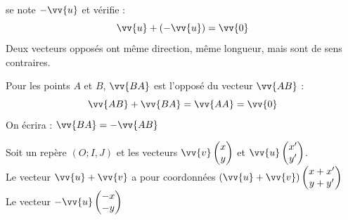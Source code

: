 \documentclass[main.tex]{subfiles}
\begin{document}
\begin{definition}
se note $-\vv{u}$ et vérifie :
\setlength{\abovedisplayskip}{3pt}
\setlength{\belowdisplayskip}{3pt} 
$$\vv{u}+(-\vv{u}) =\vv{0}$$ 
Deux vecteurs opposés ont même direction, même longueur, mais sont de sens contraires.
\end{definition}
\begin{example}Pour les points $A$ et $B$, $\vv{BA}$ est l'opposé du vecteur $\vv{AB}$ :
\setlength{\abovedisplayskip}{3pt}
\setlength{\belowdisplayskip}{3pt} 
$$\vv{AB}+\vv{BA}=\vv{AA}=\vv{0}$$  
On écrira : $\vv{BA}=-\vv{AB}$
\end{example}
\begin{tBox}
Soit un repère $(O;I,J)$ et les vecteurs $\vv{v}\begin{pmatrix}
x\\y
\end{pmatrix}$ et $\vv{u}\begin{pmatrix}
x'\\y'
\end{pmatrix}$.\\
Le vecteur $\vv{u}+\vv{v}$ a pour coordonnées 
$(\vv{u}+\vv{v})\begin{pmatrix}
x+x'\\y+y '
\end{pmatrix}$\\
Le vecteur $-\vv{u}\begin{pmatrix}
-x\\-y
\end{pmatrix}$
\end{tBox}
\end{document}
